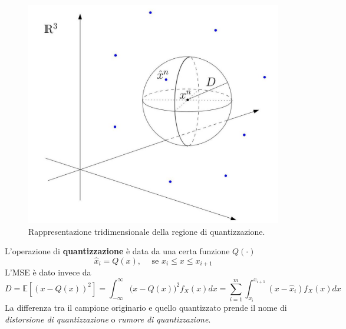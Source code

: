 \begin{figure}[H]
    \centering
    \includegraphics[scale=0.23]{img/sphere.jpg}
    \caption{Rappresentazione tridimensionale della regione di quantizzazione.}
    \label{fig:sphere}
\end{figure}
L'operazione di \textbf{quantizzazione} \`e data da una certa funzione $Q(\cdot)$
\begin{equation}
    \hat{x}_i = Q(x), \hspace{15pt} \text{se } x_i \leq x \leq x_{i+1}
\end{equation}
L'MSE \`e dato invece da
\begin{equation}
    D = \mathbb{E}[(x - Q(x))^2] =  \int_{-\infty}^{\infty} \Big ( x - Q(x) \Big )^2 f_X(x) dx = \sum_{i=1}^m \int_{x_i}^{x_{i+1}} (x - \hat{x}_i) f_X(x) dx
\end{equation}
La differenza tra il campione originario e quello quantizzato prende il nome di \textit{distorsione di quantizzazione} o \textit{rumore di quantizzazione}.

